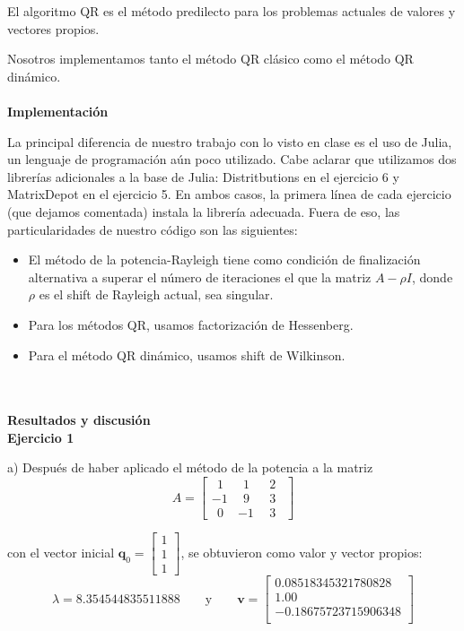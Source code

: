 \documentclass[11pt]{article}
\begin{document}
El algoritmo QR es el método predilecto para los problemas actuales de valores y vectores propios.

Nosotros implementamos tanto el método QR clásico como el método QR dinámico.
\\
\\
\noindent
\textbf{\LARGE{Implementación}}

\noindent
La principal diferencia de nuestro trabajo con lo visto en clase es el uso de Julia,
un lenguaje de programación aún poco utilizado. Cabe aclarar que utilizamos dos
librerías adicionales a la base de Julia: Distritbutions en el ejercicio 6 y
MatrixDepot en el ejercicio 5. En ambos casos, la primera línea de cada ejercicio
(que dejamos comentada) instala la librería adecuada.
Fuera de eso, las particularidades de nuestro código son las siguientes:

\begin{itemize}
	\item El método de la potencia-Rayleigh tiene como condición de finalización alternativa a superar el número de iteraciones el que la matriz $A-\rho I$, donde $\rho$ es el shift de Rayleigh actual, sea singular.
	\item Para los métodos QR, usamos factorización de Hessenberg.
	\item Para el método QR dinámico, usamos shift de Wilkinson.

\end{itemize}

\\
\\
\noindent
\textbf{\LARGE{Resultados y discusión}}
\\
\noindent
\textbf{Ejercicio 1}

a) Después de haber aplicado el método de la potencia a la matriz
$$
A =
\begin{bmatrix}
\ \ 1 & \ \ 1 & \ \ 2 \ \ \\
-1 & \ \ 9 & \ \ 3 \ \ \\
\ \ 0 & -1 & \ \ 3 \ \
\end{bmatrix}
$$

con el vector inicial $\textbf{q}_0 =
\begin{bmatrix}
1 \\
1 \\
1
\end{bmatrix}$, se obtuvieron como valor y vector propios:
 \[
 \lambda = 8.354544835511888
 \qquad\text{y}\qquad
 \textbf{v} = \begin{bmatrix}
 0.08518345321780828 \\
 1.00     \\
 -0.18675723715906348 \\
\end{bmatrix}
 \]
 \\
 \\
\end{document}
